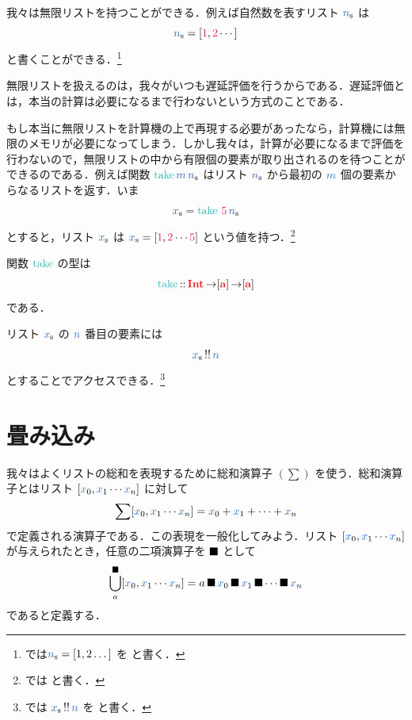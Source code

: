 \documentclass[a5paper,twoside,fleqn,draft]{jsbook}
\begin{document}
\separator

我々は無限リストを持つことができる．例えば自然数を表すリスト
$\hListVar{n}$ は
\begin{equation*}
  \hListVar{n}
  =\hListWith{\hConstant{1},\hConstant{2}\dotsb}
\end{equation*}
と書くことができる．\footnote{\haskell では$\hListVar{n}=\hListWith{1,2\dots}$ を  と書く．}

無限リストを扱えるのは，我々がいつも遅延評価を行うからである．遅延評価とは，本当の計算は必要になるまで行わないという方式のことである．

もし本当に無限リストを計算機の上で再現する必要があったなら，計算機には無限のメモリが必要になってしまう．しかし我々は，計算が必要になるまで評価を行わないので，無限リストの中から有限個の要素が取り出されるのを待つことができるのである．例えば関数 $\hTake\hVar{m}\,\hListVar{n}$ はリスト $\hListVar{n}$ から最初の $\hVar{m}$ 個の要素からなるリストを返す．いま
\begin{equation*}
  \hListVar{x}
  =\hTake\,\hConstant{5}\,\hListVar{n}
\end{equation*}
とすると，リスト $\hListVar{x}$ は $\hListVar{x}=[\hConstant{1},\hConstant{2}\dotsb\hConstant{5}]$ という値を持つ．\footnote{\haskell では  と書く．}

関数 $\hTake$ の型は
\begin{equation}
  \hTake
  \hIsTypeOf\hInt\hFunctionArrow\hListConstruct{\hTypeName{a}}\hFunctionArrow\hListConstruct{\hTypeName{a}}
\end{equation}
である．

\separator

リスト $\hListVar{x}$ の $\hVar{n}$ 番目の要素には
\begin{equation}
  \hListVar{x}\mListAt\hVar{n}
\end{equation}
とすることでアクセスできる．\footnote{\haskell では $\hListVar{x}\mListAt\hVar{n}$ を  と書く．}

\section{畳み込み}
\label{sec:convolution}

我々はよくリストの総和を表現するために総和演算子 $(\sum)$ を使う．総和演算子とはリスト $[\hVar{x}_0,\hVar{x}_1\dotsb\hVar{x}_n]$ に対して
\begin{equation}
  \sum[\hVar{x}_0,\hVar{x}_1\dotsb \hVar{x}_n]
  =\hVar{x}_0+\hVar{x}_1+\dotsb+\hVar{x}_n
\end{equation}
で定義される演算子である．この表現を一般化してみよう．リスト $[\hVar{x}_0,\hVar{x}_1\dotsb \hVar{x}_n]$ が与えられたとき，任意の二項演算子を $\operatorname{\blacksquare}$ として
\begin{equation}
  \hFold^{\hAnyBinOp}_a[\hVar{x}_0,\hVar{x}_1\dotsb \hVar{x}_n]
  =a\hAnyBinOp \hVar{x}_0\hAnyBinOp \hVar{x}_1\hAnyBinOp\dotsb\hAnyBinOp \hVar{x}_n
\end{equation}
であると定義する．
\end{document}
